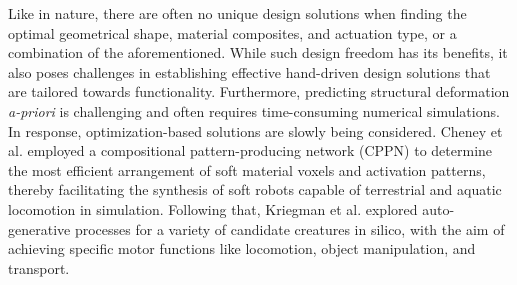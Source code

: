 
Like in nature, there are often no unique design solutions when finding the optimal geometrical shape, material composites, and actuation type, or a combination of the aforementioned. While such design freedom has its benefits, it also poses challenges in establishing effective hand-driven design solutions that are tailored towards functionality. Furthermore, predicting structural deformation \textit{a-priori} is challenging and often requires time-consuming numerical simulations. In response, optimization-based solutions are slowly being considered. Cheney et al. \cite{Cheney2013} employed a compositional pattern-producing network (CPPN) to determine the most efficient arrangement of soft material voxels and activation patterns, thereby facilitating the synthesis of soft robots capable of terrestrial and aquatic locomotion in simulation. Following that, Kriegman et al. \cite{Kriegman2019,Kriegman2020} explored auto-generative processes for a variety of candidate creatures in silico, with the aim of achieving specific motor functions like locomotion, object manipulation, and transport.

